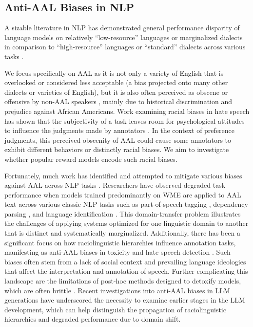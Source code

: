 \subsection{Anti-AAL Biases in NLP}
A sizable literature in NLP has demonstrated general performance disparity of language models on relatively ``low-resource'' languages or marginalized dialects in comparison to ``high-resource'' languages or ``standard'' dialects across various tasks \cite{bang_multitask_2023, jiao_is_2023, robinson_chatgpt_2023, hendy_how_2023, kantharuban_quantifying_2023, fleisig2024linguisticbiaschatgptlanguage,  harris_modeling_2024}. 

We focus specifically on AAL as it is not only a variety of English that is overlooked or considered less acceptable (a bias projected onto many other dialects or varieties of English), but it is also often perceived as obscene or offensive by non-AAL speakers \cite{spears1998}, mainly due to historical discrimination and prejudice against African Americans. Work examining racial biases in hate speech has shown that the subjectivity of a task leaves room for psychological attitudes to influence the judgments made by annotators \cite{sap_annotators_2022}. In the context of preference judgments, this perceived obscenity of AAL could cause some annotators to exhibit different behaviors or distinctly racial biases. We aim to investigate whether popular reward models encode such racial biases.

Fortunately, much work has identified and attempted to mitigate various biases against AAL across NLP tasks \cite{blodgett_language_2020}. Researchers have observed degraded task performance when models trained predominantly on WME are applied to AAL text across various classic NLP tasks such as part-of-speech tagging \cite{jorgensen-etal-2015-challenges, dacon-2022-towards}, dependency parsing \cite{blodgett_demographic_2016}, and language identification \cite{blodgett_racial_2017}. This domain-transfer problem illustrates the challenges of applying systems optimized for one linguistic domain to another that is distinct and systematically marginalized. Additionally, there has been a significant focus on how raciolinguistic hierarchies influence annotation tasks, manifesting as anti-AAL biases in toxicity and hate speech detection \cite{sap_risk_2019, davidson-etal-2019-racial, sap_annotators_2022, harris_exploring_2022}. Such biases often stem from a lack of social context and prevailing language ideologies that affect the interpretation and annotation of speech. Further complicating this landscape are the limitations of post-hoc methods designed to detoxify models, which are often brittle \cite{xu_detoxifying_2021, zhou_challenges_2021}. Recent investigations into anti-AAL biases in LLM generations \cite{groenwold-etal-2020-investigating, deas_evaluation_2023, hofmann_ai_2024} have underscored the necessity to examine earlier stages in the LLM development, which can help distinguish the propagation of raciolinguistic hierarchies and degraded performance due to domain shift.